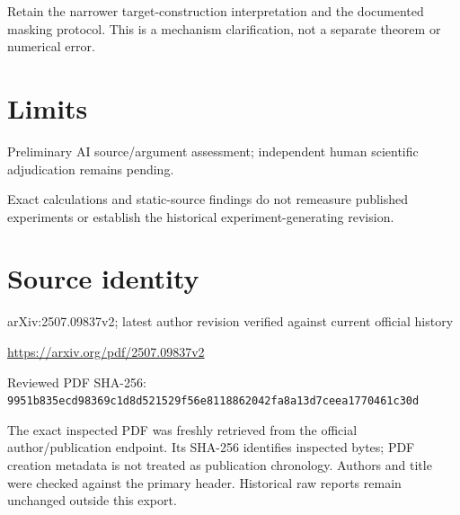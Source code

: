 \documentclass[11pt]{article}
\begin{document}
Retain the narrower target-construction interpretation and the documented masking protocol. This is a mechanism clarification, not a separate theorem or numerical error.

\section*{Limits}

Preliminary AI source/argument assessment; independent human scientific adjudication remains pending.\par

Exact calculations and static-source findings do not remeasure published experiments or establish the historical experiment-generating revision.\par

\section*{Source identity}

arXiv:2507.09837v2; latest author revision verified against current official history

\url{https://arxiv.org/pdf/2507.09837v2}

Reviewed PDF SHA-256: \nolinkurl{9951b835ecd98369c1d8d521529f56e8118862042fa8a13d7ceea1770461c30d}

The exact inspected PDF was freshly retrieved from the official author/publication endpoint. Its SHA-256 identifies inspected bytes; PDF creation metadata is not treated as publication chronology. Authors and title were checked against the primary header. Historical raw reports remain unchanged outside this export.
\end{document}
